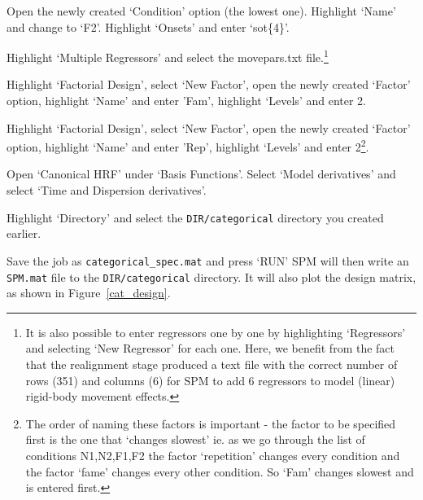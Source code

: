 \item{Open the newly created `Condition' option (the lowest one). Highlight `Name' and change to `F2'. Highlight `Onsets' and enter `sot\{4\}'.}
\item{Highlight `Multiple Regressors' and select the {\sf movepars.txt} file.\footnote{It is also possible to enter regressors one by one by highlighting `Regressors' and selecting `New Regressor' for each one. Here, we benefit from the fact that the realignment stage produced a text file with the correct number of rows (351) and columns (6) for SPM to add 6 regressors to model (linear) rigid-body movement effects.}}
\item{Highlight `Factorial Design', select `New Factor', open the newly created `Factor' option, highlight `Name' and enter 'Fam', highlight `Levels' and enter 2.}
\item{Highlight `Factorial Design', select `New Factor', open the newly created `Factor' option, highlight `Name' and enter 'Rep', highlight `Levels' and enter 2\footnote{The order of naming these factors is important - the factor to be specified first is the one that `changes slowest' ie. as we go through the list of conditions N1,N2,F1,F2 the factor `repetition' changes every condition and the 
factor `fame' changes every other condition. So `Fam' changes slowest and is entered first.}.}
\item{Open `Canonical HRF' under `Basis Functions'. Select `Model derivatives' and select `Time and Dispersion derivatives'.}
\item{Highlight `Directory' and select the \verb!DIR/categorical! directory you created earlier.}
\item{Save the job as \verb!categorical_spec.mat! and press `RUN'}
\ei
SPM will then write an \verb$SPM.mat$ file to the 
\verb!DIR/categorical! directory. It will also plot the design
matrix, as shown in Figure~\ref{cat_design}. 
